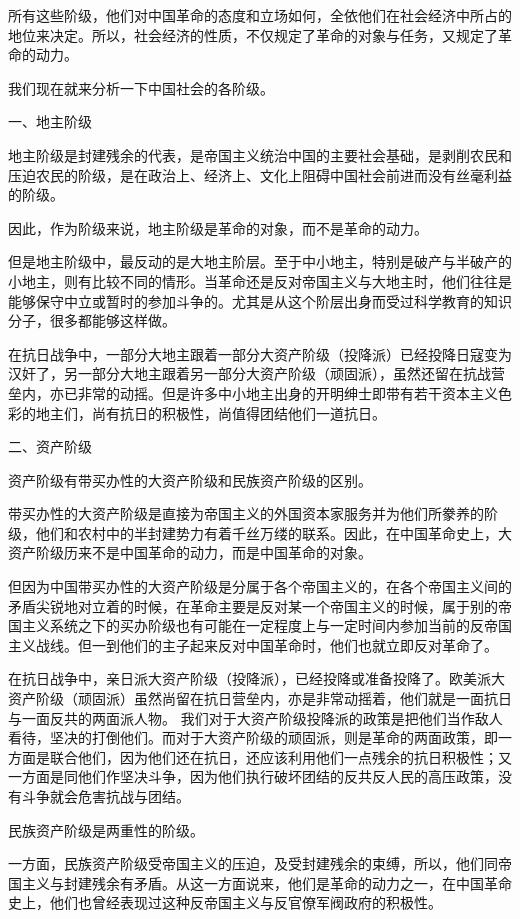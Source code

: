 \documentclass[UTF8, 12pt, a4paper]{ctexrep}
\begin{document}
所有这些阶级，他们对中国革命的态度和立场如何，全依他们在社会经济中所占的地位来决定。所以，社会经济的性质，不仅规定了革命的对象与任务，又规定了革命的动力。

我们现在就来分析一下中国社会的各阶级。

一、地主阶级

地主阶级是封建残余的代表，是帝国主义统治中国的主要社会基础，是剥削农民和压迫农民的阶级，是在政治上、经济上、文化上阻碍中国社会前进而没有丝毫利益的阶级。

因此，作为阶级来说，地主阶级是革命的对象，而不是革命的动力。

但是地主阶级中，最反动的是大地主阶层。至于中小地主，特别是破产与半破产的小地主，则有比较不同的情形。当革命还是反对帝国主义与大地主时，他们往往是能够保守中立或暂时的参加斗争的。尤其是从这个阶层出身而受过科学教育的知识分子，很多都能够这样做。

在抗日战争中，一部分大地主跟着一部分大资产阶级（投降派）已经投降日寇变为汉奸了，另一部分大地主跟着另一部分大资产阶级（顽固派），虽然还留在抗战营垒内，亦已非常的动摇。但是许多中小地主出身的开明绅士即带有若干资本主义色彩的地主们，尚有抗日的积极性，尚值得团结他们一道抗日。

二、资产阶级

资产阶级有带买办性的大资产阶级和民族资产阶级的区别。

带买办性的大资产阶级是直接为帝国主义的外国资本家服务并为他们所豢养的阶级，他们和农村中的半封建势力有着千丝万缕的联系。因此，在中国革命史上，大资产阶级历来不是中国革命的动力，而是中国革命的对象。

但因为中国带买办性的大资产阶级是分属于各个帝国主义的，在各个帝国主义间的矛盾尖锐地对立着的时候，在革命主要是反对某一个帝国主义的时候，属于别的帝国主义系统之下的买办阶级也有可能在一定程度上与一定时间内参加当前的反帝国主义战线。但一到他们的主子起来反对中国革命时，他们也就立即反对革命了。

在抗日战争中，亲日派大资产阶级（投降派），已经投降或准备投降了。欧美派大资产阶级（顽固派）虽然尚留在抗日营垒内，亦是非常动摇着，他们就是一面抗日与一面反共的两面派人物。 我们对于大资产阶级投降派的政策是把他们当作敌人看待，坚决的打倒他们。而对于大资产阶级的顽固派，则是革命的两面政策，即一方面是联合他们，因为他们还在抗日，还应该利用他们一点残余的抗日积极性；又一方面是同他们作坚决斗争，因为他们执行破坏团结的反共反人民的高压政策，没有斗争就会危害抗战与团结。

民族资产阶级是两重性的阶级。

一方面，民族资产阶级受帝国主义的压迫，及受封建残余的束缚，所以，他们同帝国主义与封建残余有矛盾。从这一方面说来，他们是革命的动力之一，在中国革命史上，他们也曾经表现过这种反帝国主义与反官僚军阀政府的积极性。
\end{document}
